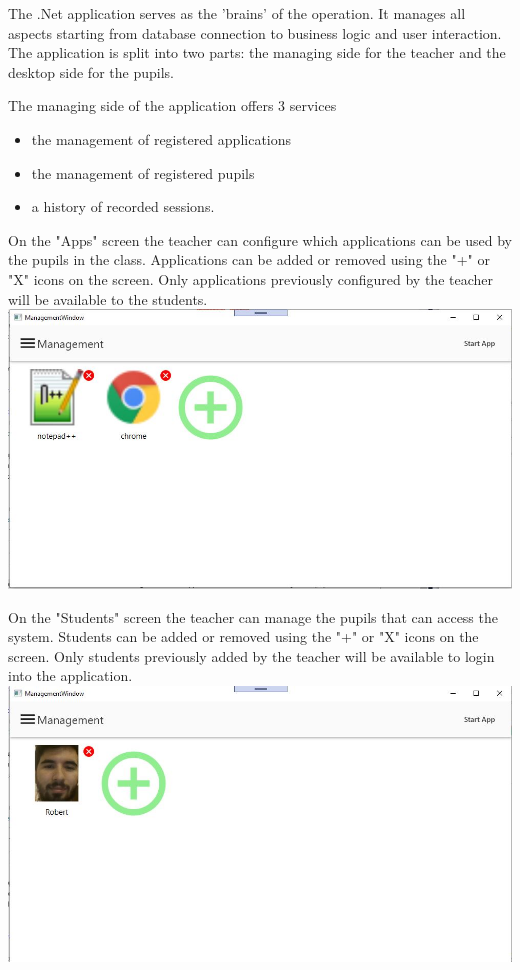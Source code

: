 \documentclass[runningheads,a4paper,11pt]{report}
\begin{document}
The .Net application serves as the 'brains' of the operation. It manages all aspects starting from database connection to business logic and user interaction.
The application is split into two parts: the managing side for the teacher and the desktop side for the pupils.

The managing side of the application offers 3 services
\begin{itemize}
    \item the management of registered applications
    \item the management of registered pupils
    \item a history of recorded sessions.
\end{itemize}

On the "Apps" screen the teacher can configure which applications can be used by the pupils in the class. Applications can be added or removed using the "+" or "X" icons on the screen. Only applications previously configured by the teacher will be available to the students.
\newline
\includegraphics[width=0.5\linewidth]{./Fig/Apps.JPG}

On the "Students" screen the teacher can manage the pupils that can access the system. Students can be added or removed using the "+" or "X" icons on the screen. Only students previously added by the teacher will be available to login into the application.
\newline
\includegraphics[width=0.5\linewidth]{./Fig/Students.JPG}
\end{document}
